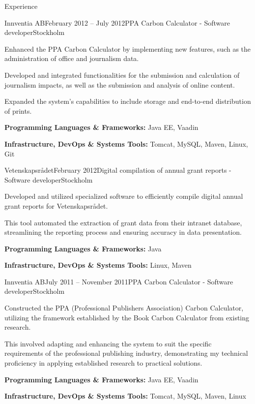 \documentclass{resume}
\begin{document}
\begin{rSection}{Experience}
    \begin{rSubsection}{Innventia AB}{February 2012 -- July 2012}{PPA Carbon Calculator - Software developer}{Stockholm}
      \item Enhanced the PPA Carbon Calculator by implementing new features, such as the administration of office and journalism data.
      \item Developed and integrated functionalities for the submission and calculation of journalism impacts, as well as the submission and analysis of online content.
      \item Expanded the system's capabilities to include storage and end-to-end distribution of prints.
      \item \textbf{Programming Languages \& Frameworks:} Java EE, Vaadin
      \item \textbf{Infrastructure, DevOps \& Systems Tools:} Tomcat, MySQL, Maven, Linux, Git
    \end{rSubsection}

    \begin{rSubsection}{Vetenskapsrådet}{February 2012}{Digital compilation of annual grant reports - Software developer}{Stockholm}
      \item Developed and utilized specialized software to efficiently compile digital annual grant reports for Vetenskapsrådet.
      \item This tool automated the extraction of grant data from their intranet database, streamlining the reporting process and ensuring accuracy in data presentation.
      \item \textbf{Programming Languages \& Frameworks:} Java
      \item \textbf{Infrastructure, DevOps \& Systems Tools:} Linux, Maven
    \end{rSubsection}

    \begin{rSubsection}{Innventia AB}{July 2011 -- November 2011}{PPA Carbon Calculator - Software developer}{Stockholm}
      \item Constructed the PPA (Professional Publishers Association) Carbon Calculator, utilizing the framework established by the Book Carbon Calculator from existing research.
      \item This involved adapting and enhancing the system to suit the specific requirements of the professional publishing industry, demonstrating my technical proficiency in applying established research to practical solutions.
      \item \textbf{Programming Languages \& Frameworks:} Java EE, Vaadin
      \item \textbf{Infrastructure, DevOps \& Systems Tools:} Tomcat, MySQL, Maven, Linux
    \end{rSubsection}
  \end{rSection}
\end{document}
